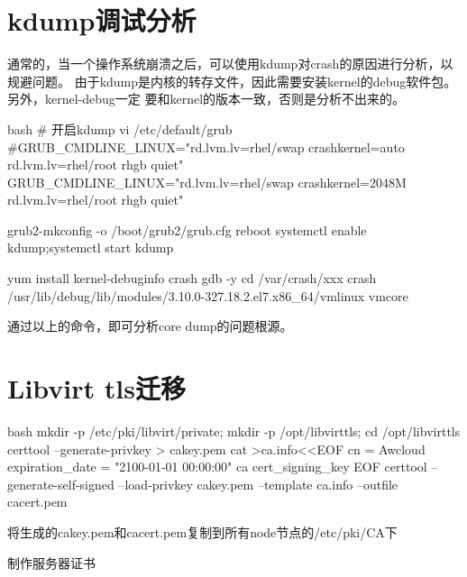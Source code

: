 \section{kdump调试分析}
通常的，当一个操作系统崩溃之后，可以使用kdump对crash的原因进行分析，以规避问题。
由于kdump是内核的转存文件，因此需要安装kernel的debug软件包。另外，kernel-debug一定
要和kernel的版本一致，否则是分析不出来的。
\begin{code-block}{bash}
# 开启kdump
vi /etc/default/grub
#GRUB_CMDLINE_LINUX="rd.lvm.lv=rhel/swap crashkernel=auto rd.lvm.lv=rhel/root rhgb quiet"
GRUB_CMDLINE_LINUX="rd.lvm.lv=rhel/swap crashkernel=2048M rd.lvm.lv=rhel/root rhgb quiet"

grub2-mkconfig -o /boot/grub2/grub.cfg
reboot
systemctl enable kdump;systemctl start kdump

yum install kernel-debuginfo crash gdb -y
cd /var/crash/xxx
crash /usr/lib/debug/lib/modules/3.10.0-327.18.2.el7.x86_64/vmlinux vmcore
\end{code-block}

通过以上的命令，即可分析core dump的问题根源。

\section{Libvirt tls迁移}
\begin{code-block}{bash}
mkdir -p /etc/pki/libvirt/private;
mkdir -p /opt/libvirttls;
cd /opt/libvirttls
certtool --generate-privkey > cakey.pem
cat >ca.info<<EOF
cn = Awcloud
expiration_date = "2100-01-01 00:00:00"
ca
cert_signing_key
EOF
certtool --generate-self-signed --load-privkey cakey.pem --template ca.info --outfile cacert.pem
\end{code-block}

将生成的cakey.pem和cacert.pem复制到所有node节点的/etc/pki/CA下

制作服务器证书

